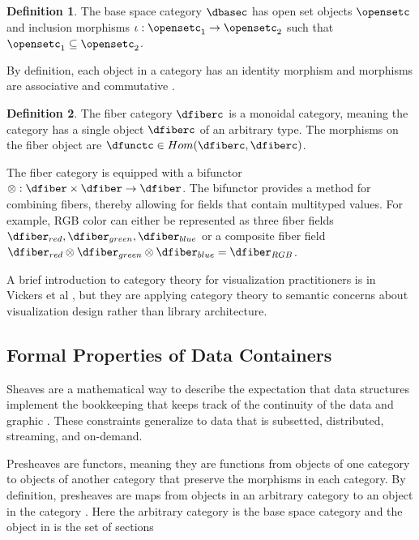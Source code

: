 \documentclass[10pt,journal,compsoc]{IEEEtran}
\theoremstyle{definition}
\newtheorem{definition}{Definition}[section]
\theoremstyle{remark}
\begin{document}
\begin{definition}
  \label{sec:atct:io:base}
  The base space category $\mathcal{\dbasec}$ has open set objects $\opensetc$ and inclusion morphisms $\iota: \opensetc_1 \rightarrow \opensetc_2$ such that $\opensetc_1 \subseteq \opensetc_2$. 
\end{definition}

By definition, each object in a category has an identity morphism and morphisms are associative and commutative \cite{barrCategoryTheoryComputing}. 

\begin{definition}
  \label{def:atct:io:fiber}
  The fiber category $\mathcal{\dfiberc}$ is a monoidal category, meaning the category has a single object $\dfiberc$ of an arbitrary type. The morphisms on the fiber object are $\dfunctc \in Hom(\dfiberc, \dfiberc)$. 
\end{definition}

The fiber category is equipped with a bifunctor $\otimes: \mathcal{\dfiber} \times \mathcal{\dfiber} \rightarrow \mathcal{\dfiber}$. The bifunctor provides a method for combining fibers, thereby allowing for fields that contain multityped values. For example, RGB color can either be represented as three fiber fields $\dfiber_{red}, \dfiber_{green}, \dfiber_{blue}$ or a composite fiber field $\dfiber_{red} \otimes \dfiber_{green} \otimes \dfiber_{blue} = \dfiber_{RGB}$.

A brief introduction to category theory for visualization practitioners is in Vickers et al \cite{vickersUnderstandingVisualizationFormal2013}, but they are applying category theory to semantic concerns about visualization design rather than library architecture. 


\subsection{Formal Properties of Data Containers}
\label{sec:atct:sheaves}
Sheaves are a mathematical way to describe the expectation that data structures implement the bookkeeping that keeps track of the continuity of the data and graphic \cite{ghristElementaryAppliedTopology2014}. These constraints generalize to data that is subsetted, distributed, streaming, and on-demand.

Presheaves are functors, meaning they are functions from objects of one category to objects of another category\cite{WhatFunctorDefinitions} that preserve the morphisms in each category. By definition, presheaves are maps from objects in an arbitrary category to an object in the category \setb\cite{nlab:presheaf}. Here the arbitrary category is the base space category and the object in \setb is the set of sections
 
\end{document}
